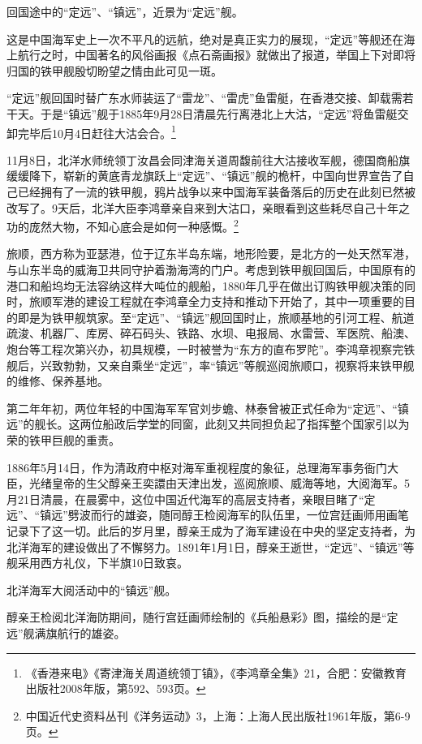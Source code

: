 \documentclass[12pt,UTF8]{ctexbook}
\begin{document}
回国途中的“定远”、“镇远”，近景为“定远”舰。

这是中国海军史上一次不平凡的远航，绝对是真正实力的展现，“定远”等舰还在海上航行之时，中国著名的风俗画报《点石斋画报》就做出了报道，举国上下对即将归国的铁甲舰殷切盼望之情由此可见一斑。

“定远”舰回国时替广东水师装运了“雷龙”、“雷虎”鱼雷艇，在香港交接、卸载需若干天。于是“镇远”舰于1885年9月28日清晨先行离港北上大沽，“定远”将鱼雷艇交卸完毕后10月4日赶往大沽会合。\footnote{《香港来电》《寄津海关周道统领丁镇》，《李鸿章全集》21，合肥：安徽教育出版社2008年版，第592、593页。}

11月8日，北洋水师统领丁汝昌会同津海关道周馥前往大沽接收军舰，德国商船旗缓缓降下，崭新的黄底青龙旗跃上“定远”、“镇远”舰的桅杆，中国向世界宣告了自己已经拥有了一流的铁甲舰，鸦片战争以来中国海军装备落后的历史在此刻已然被改写了。9天后，北洋大臣李鸿章亲自来到大沽口，亲眼看到这些耗尽自己十年之功的庞然大物，不知心底会是如何一种感慨。\footnote{中国近代史资料丛刊《洋务运动》3，上海：上海人民出版社1961年版，第6-9页。}

旅顺，西方称为亚瑟港，位于辽东半岛东端，地形险要，是北方的一处天然军港，与山东半岛的威海卫共同守护着渤海湾的门户。考虑到铁甲舰回国后，中国原有的港口和船坞均无法容纳这样大吨位的舰船，1880年几乎在做出订购铁甲舰决策的同时，旅顺军港的建设工程就在李鸿章全力支持和推动下开始了，其中一项重要的目的即是为铁甲舰筑家。至“定远”、“镇远”舰回国时止，旅顺基地的引河工程、航道疏浚、机器厂、库房、碎石码头、铁路、水坝、电报局、水雷营、军医院、船澳、炮台等工程次第兴办，初具规模，一时被誉为“东方的直布罗陀”。李鸿章视察完铁舰后，兴致勃勃，又亲自乘坐“定远”，率“镇远”等舰巡阅旅顺口，视察将来铁甲舰的维修、保养基地。

第二年年初，两位年轻的中国海军军官刘步蟾、林泰曾被正式任命为“定远”、“镇远”的舰长。这两位船政后学堂的同窗，此刻又共同担负起了指挥整个国家引以为荣的铁甲巨舰的重责。

1886年5月14日，作为清政府中枢对海军重视程度的象征，总理海军事务衙门大臣，光绪皇帝的生父醇亲王奕譞由天津出发，巡阅旅顺、威海等地，大阅海军。5月21日清晨，在晨雾中，这位中国近代海军的高层支持者，亲眼目睹了“定远”、“镇远”劈波而行的雄姿，随同醇王检阅海军的队伍里，一位宫廷画师用画笔记录下了这一切。此后的岁月里，醇亲王成为了海军建设在中央的坚定支持者，为北洋海军的建设做出了不懈努力。1891年1月1日，醇亲王逝世，“定远”、“镇远”等舰采用西方礼仪，下半旗10日致哀。

北洋海军大阅活动中的“镇远”舰。

醇亲王检阅北洋海防期间，随行宫廷画师绘制的《兵船悬彩》图，描绘的是“定远”舰满旗航行的雄姿。
\end{document}
